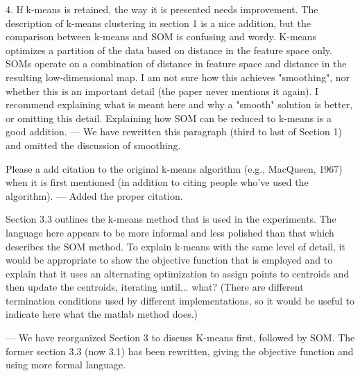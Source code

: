 4. If k-means is retained, the way it is presented needs improvement. The description of k-means clustering in section 1 is a nice addition, but the comparison between k-means and SOM is confusing and wordy. K-means optimizes a partition of the data based on distance in the feature space only.  SOMs operate on a combination of distance in feature space and distance in the resulting low-dimensional map.  I am not sure how this achieves "smoothing", nor whether this is an important detail (the paper never mentions it again).  I recommend explaining what is meant here and why a "smooth" solution is better, or omitting this detail.  Explaining how SOM can be reduced to k-means is a good addition.
--- We have rewritten this paragraph (third to last of Section 1) and omitted the discussion of smoothing. 

Please a add citation to the original k-means algorithm (e.g., MacQueen, 1967) when it is first mentioned (in addition to citing people who've used the algorithm).
--- Added the proper citation.

Section 3.3 outlines the k-means method that is used in the experiments.  The language here appears to be more informal and less polished than that which describes the SOM method.  To explain k-means with the same level of detail, it would be appropriate to show the objective function that is employed and to explain that it uses an alternating optimization to assign points to centroids and then update the centroids, iterating until... what?  (There are different termination conditions used by different implementations, so it would be useful to indicate here what the matlab method does.)

--- We have reorganized Section 3 to discuss K-means first, followed by SOM. The former section 3.3 (now 3.1) has been rewritten, giving the objective function and using more formal language. 

